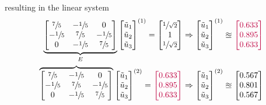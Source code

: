 resulting in the linear system
\begin{align*}
	\underbrace{
		\begin{bmatrix}
			\sfrac{7}{5} & -\sfrac{1}{5} & 0 \\
			-\sfrac{1}{5} & \sfrac{7}{5} & -\sfrac{1}{5} \\
			0 & -\sfrac{1}{5} & \sfrac{7}{5}
		\end{bmatrix}
	}_{E}
	\begin{bmatrix}
		\tilde{u}_1 \\
		\tilde{u}_2 \\
		\tilde{u}_3 \\
	\end{bmatrix}^{(1)}
	=
	\begin{bmatrix}
		\sfrac{1}{\sqrt{2}} \\
		1 \\
		\sfrac{1}{\sqrt{2}}
	\end{bmatrix}
	& \Rightarrow
	\begin{bmatrix}
		\tilde{u}_1 \\
		\tilde{u}_2 \\
		\tilde{u}_3 \\
	\end{bmatrix}^{(1)}
	\approxeq
	{\color{purple}
	\begin{bmatrix}
		0.633 \\
		0.895 \\
		0.633
	\end{bmatrix}
	} \\
	\overbrace{
		\begin{bmatrix}
			\sfrac{7}{5} & -\sfrac{1}{5} & 0 \\
			-\sfrac{1}{5} & \sfrac{7}{5} & -\sfrac{1}{5} \\
			0 & -\sfrac{1}{5} & \sfrac{7}{5}
		\end{bmatrix}
	}
	\begin{bmatrix}
		\tilde{u}_1 \\
		\tilde{u}_2 \\
		\tilde{u}_3 \\
	\end{bmatrix}^{(2)}
	= {\color{purple}
	\begin{bmatrix}
		0.633 \\
		0.895 \\
		0.633
	\end{bmatrix}
	}
	& \Rightarrow
	\begin{bmatrix}
		\tilde{u}_1 \\
		\tilde{u}_2 \\
		\tilde{u}_3 \\
	\end{bmatrix}^{(2)}
	\approxeq
	\begin{bmatrix}
		0.567 \\
		0.801 \\
		0.567
	\end{bmatrix}
\end{align*}

